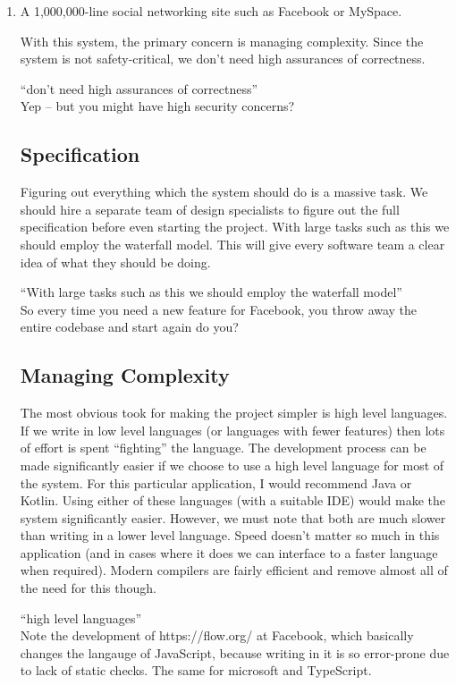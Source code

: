 \documentclass[10pt,\jkfside,a4paper]{article}
\begin{document}
\begin{enumerate}
\begin{enumerate}[label=(\alph*)]
\item A 1,000,000-line social networking site such as Facebook or MySpace.

With this system, the primary concern is managing complexity. Since the system is not safety-critical,
we don't need high assurances of correctness.

{\color{blue}
``don't need high assurances of correctness''\\
Yep -- but you might have high security concerns?
}

\subsection*{Specification}

Figuring out everything which the system should do is a massive task. We should hire a separate team of design
specialists to figure out the full specification before even starting the project.
With large tasks such as this we should employ the waterfall model. This will give every software team a
clear idea of what they should be doing.

{\color{blue}
``With large tasks such as this we should employ the waterfall model''\\
So every time you need a new feature for Facebook, you throw away the entire
codebase and start again do you?
}

\subsection*{Managing Complexity}

The most obvious took for making the project simpler is high level languages. If we write in low level languages (or
languages with fewer features) then lots of effort is spent ``fighting'' the language. The development process can be
made significantly easier if we choose to use a high level language for most of the system. For this particular
application, I would recommend Java or Kotlin. Using either of these languages (with a suitable IDE) would make the
system significantly easier. However, we must note that both are much slower than writing in a lower level language.
Speed doesn't matter so much in this application (and in cases where it does we can interface to a faster language
when required). Modern compilers are fairly efficient and remove almost all of the need for this though.

{\color{blue}
``high level languages''\\
Note the development of https://flow.org/ at Facebook, which basically changes the
langauge of JavaScript, because writing in it is so error-prone due to lack of
static checks. The same for microsoft and TypeScript.
}


\end{enumerate}
\end{enumerate}
\end{document}
